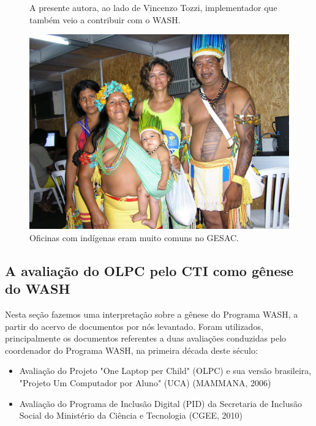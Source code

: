 \begin{figure}[p]
\begin{minipage}[b]{0.4\linewidth}
                \caption{A presente autora, ao lado de Vincenzo Tozzi, implementador que também veio a contribuir com o WASH.}
                \label{4459669909728990ef00df4bdb6a369f3449704e}
\end{minipage}
\hspace{0.5cm}
\begin{minipage}[b]{0.4\linewidth}
        \centering
                \includegraphics[width=1.0\linewidth]{../../../imagens/povo.JPG}
                \caption{Oficinas com indígenas eram muito comuns no GESAC.}
                \label{50c13a4f82feece9e41db915d8e5bc4c5d5094dd}
\end{minipage}%
\hspace{0.5cm}
\end{figure}



\subsection[A avaliação do OLPC pelo CTI como gênese do WASH]{A avaliação do OLPC pelo CTI como gênese do WASH}\label{A avaliação do OLPC pelo CTI como gênese do WASH}
Nesta seção fazemos uma interpretação sobre a gênese do Programa WASH, a partir do acervo de documentos por nós levantado. Foram utilizados, principalmente  os documentos referentes a duas avaliações conduzidas pelo coordenador do Programa WASH, na primeira década deste século:


\begin{itemize}
\item Avaliação do Projeto "One Laptop per Child" (OLPC) e sua versão brasileira, "Projeto Um Computador por Aluno" (UCA) (MAMMANA, 2006)
\item Avaliação do Programa de Inclusão Digital (PID) da Secretaria de Inclusão Social do Ministério da Ciência e Tecnologia (CGEE, 2010)
\end{itemize}

